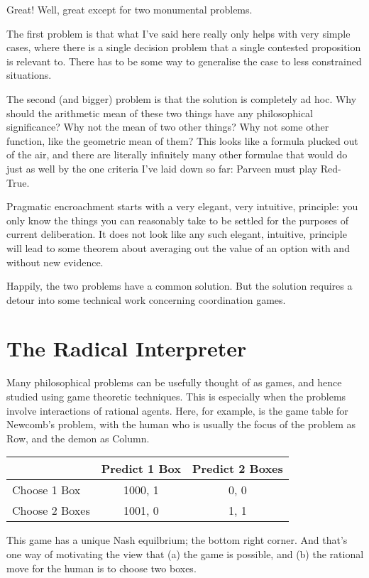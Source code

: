 \documentclass[
  11pt,
]{book}
\begin{document}
Great! Well, great except for two monumental problems.

The first problem is that what I've said here really only helps with very simple cases, where there is a single decision problem that a single contested proposition is relevant to. There has to be some way to generalise the case to less constrained situations.

The second (and bigger) problem is that the solution is completely ad hoc. Why should the arithmetic mean of these two things have any philosophical significance? Why not the mean of two other things? Why not some other function, like the geometric mean of them? This looks like a formula plucked out of the air, and there are literally infinitely many other formulae that would do just as well by the one criteria I've laid down so far: Parveen must play Red-True.

Pragmatic encroachment starts with a very elegant, very intuitive, principle: you only know the things you can reasonably take to be settled for the purposes of current deliberation. It does not look like any such elegant, intuitive, principle will lead to some theorem about averaging out the value of an option with and without new evidence.

Happily, the two problems have a common solution. But the solution requires a detour into some technical work concerning coordination games.

\hypertarget{radicalinterpretation}{%
\section{The Radical Interpreter}\label{radicalinterpretation}}

Many philosophical problems can be usefully thought of as games, and hence studied using game theoretic techniques. This is especially when the problems involve interactions of rational agents. Here, for example, is the game table for Newcomb's problem, with the human who is usually the focus of the problem as Row, and the demon as Column.

\begin{longtable}[]{@{}lcc@{}}
\toprule()
& Predict 1 Box & Predict 2 Boxes \\
\midrule()
\endhead
Choose 1 Box & 1000, 1 & 0, 0 \\
Choose 2 Boxes & 1001, 0 & 1, 1 \\
\bottomrule()
\end{longtable}

This game has a unique Nash equilbrium; the bottom right corner. And that's one way of motivating the view that (a) the game is possible, and (b) the rational move for the human is to choose two boxes.
\end{document}
